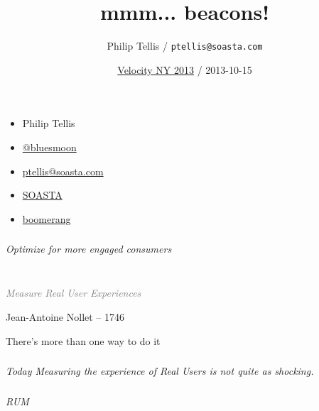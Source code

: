 \documentclass{beamer}
\author{Philip Tellis / \texttt{ptellis@soasta.com}}
\title{mmm... beacons!}
\date{\href{http://velocityconf.com/velocityny2013/public/schedule/detail/32748}{Velocity NY 2013} / 2013-10-15}
\newcommand{\innersplash}[1]{
  \begin{center}
    \Large \textrm{\textit{ #1 } }
  \end{center}
}
\newcommand{\splashslide}[2][{}]{
  \begin{frame}
  \frametitle{#1}
  \innersplash{#2}
  \end{frame}
}
\newcommand{\leadinslide}[2]{
  \splashslide{
     {\fontsize{150}{20}\selectfont{\raisebox{0pt}[90pt][0pt]{\textcolor{light-gray}{#1}}}} \\ \huge \textcolor{gray}{#2}
  }
}
\begin{document}
\begin{frame}
  \begin{itemize}
  \item Philip Tellis
  \item \href{http://twitter.com/bluesmoon}{@bluesmoon}
  \item \href{http://bluesmoon.info/}{ptellis@soasta.com}
  \item \href{http://www.soasta.com/}{SOASTA}
  \item \href{http://lognormal.github.com/boomerang/doc/}{boomerang}
  \end{itemize}
\end{frame}

\begin{frame}
  \titlepage
\end{frame}

\begin{frame}{}
\end{frame}

\splashslide{Optimize for more engaged consumers}

\leadinslide{1}{Measure Real User Experiences}

\begin{frame}{Jean-Antoine Nollet -- 1746}
\end{frame}

\begin{frame}{There's more than one way to do it}
\end{frame}

\splashslide{Today Measuring the experience of Real Users is not quite as shocking.}

\splashslide{RUM \\ }
\end{document}
